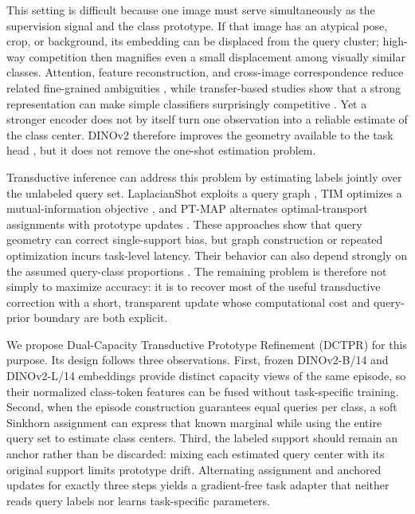 \documentclass[]{spie}
\newcommand{\method}{\textsc{DCTPR}\xspace}
\begin{document}
This setting is difficult because one image must serve simultaneously as the
supervision signal and the class prototype. If that image has an atypical pose,
crop, or background, its embedding can be displaced from the query cluster;
high-way competition then magnifies even a small displacement among visually
similar classes. Attention, feature reconstruction, and cross-image
correspondence reduce related fine-grained ambiguities
\cite{mamlfgvc,dualattention,bfrn}, while transfer-based studies show that a
strong representation can make simple classifiers surprisingly competitive
\cite{closerlook,goodembedding,simpleshot}. Yet a stronger encoder does not by
itself turn one observation into a reliable estimate of the class center.
DINOv2 therefore improves the geometry available to the task head
\cite{dinov2}, but it does not remove the one-shot estimation problem.

Transductive inference can address this problem by estimating labels jointly
over the unlabeled query set. LaplacianShot exploits a query graph
\cite{laplacianshot}, TIM optimizes a mutual-information objective \cite{tim},
and PT-MAP alternates optimal-transport assignments with prototype updates
\cite{ptmap}. These approaches show that query geometry can correct
single-support bias, but graph construction or repeated optimization incurs
task-level latency. Their behavior can also depend strongly on the assumed
query-class proportions \cite{realistictransduction}. The remaining problem is
therefore not simply to maximize accuracy: it is to recover most of the useful
transductive correction with a short, transparent update whose computational
cost and query-prior boundary are both explicit.

We propose Dual-Capacity Transductive Prototype Refinement (\method) for this
purpose. Its design follows three observations. First, frozen DINOv2-B/14 and
DINOv2-L/14 embeddings provide distinct capacity views of the same episode, so
their normalized class-token features can be fused without task-specific
training. Second, when the episode construction guarantees equal queries per
class, a soft Sinkhorn assignment can express that known marginal while using
the entire query set to estimate class centers. Third, the labeled support
should remain an anchor rather than be discarded: mixing each estimated query
center with its original support limits prototype drift. Alternating assignment
and anchored updates for exactly three steps yields a gradient-free task adapter
that neither reads query labels nor learns task-specific parameters.
\end{document}
